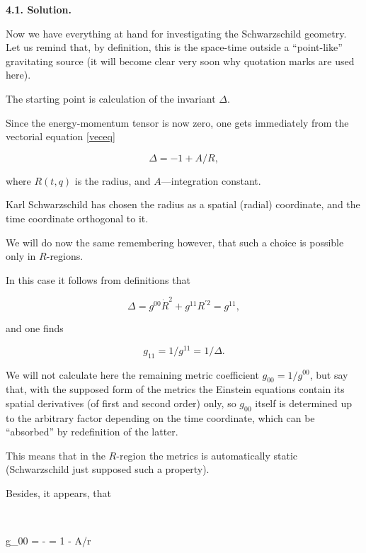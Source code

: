 \textbf{4.1. Solution.}

Now we have everything at hand for investigating the Schwarz\-schild geometry. Let us remind that, by definition, this is the space-time outside a ``point-like'' gravitating source (it will become clear very soon why quotation marks are used here).



The starting point is calculation of the invariant $\Delta$. 

Since the energy-momentum tensor is now zero, one gets immediately from the vectorial equation \eqref{veceq}

\begin{equation}

\label{deltaschw}

\Delta = -1 + {A}/{R} ,

\end{equation}

where $R(t,q)$ is the radius, and $A$---integration constant. 

Karl Schwarzschild has chosen the radius as a spatial (radial) coordinate, and the time coordinate ortho\-gonal to it. 

We will do now the same remembering however, that such a choice is possible only in $R$-regions. 

In this case it follows from definitions that 

$$

\Delta = g^{00} \dot R^2 + g^{11} R^{\prime 2} = g^{11},

$$ 

and one finds 

$$

g_{11} =  1/g^{11} =  {1}/{\Delta}.

$$ 

We will not calculate here the remaining metric coefficient   $g_{00} = 1/g^{00}$, but say that, with the supposed form of the metrics the Einstein equations contain its spatial derivatives (of first and second order) only, so  $g_{00}$ itself is determined up to the arbitrary factor depending on the time coordinate, which can be ``absorbed'' by redefinition of the latter.  

This means that in the $R$-region the metrics is automatically static (Schwarzschild just supposed such a property). 

Besides, it appears, that  

$$

g_{00} = - \Delta = 1 - {A}/{r}

